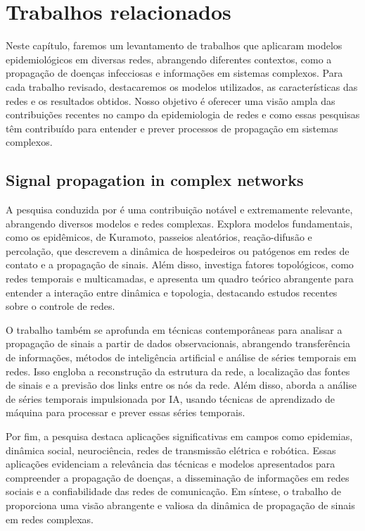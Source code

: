 \chapter{Trabalhos relacionados}

Neste capítulo, faremos um levantamento de trabalhos que aplicaram modelos epidemiológicos em diversas redes, abrangendo diferentes contextos, como a propagação de doenças infecciosas e informações em sistemas complexos. Para cada trabalho revisado, destacaremos os modelos utilizados, as características das redes e os resultados obtidos. Nosso objetivo é oferecer uma visão ampla das contribuições recentes no campo da epidemiologia de redes e como essas pesquisas têm contribuído para entender e prever processos de propagação em sistemas complexos.

\section{Signal propagation in complex networks}

A pesquisa conduzida por  é uma contribuição notável e extremamente relevante, abrangendo diversos modelos e redes complexas. Explora modelos fundamentais, como os epidêmicos, de Kuramoto, passeios aleatórios, reação-difusão e percolação, que descrevem a dinâmica de hospedeiros ou patógenos em redes de contato e a propagação de sinais. Além disso, investiga fatores topológicos, como redes temporais e multicamadas, e apresenta um quadro teórico abrangente para entender a interação entre dinâmica e topologia, destacando estudos recentes sobre o controle de redes.

O trabalho também se aprofunda em técnicas contemporâneas para analisar a propagação de sinais a partir de dados observacionais, abrangendo transferência de informações, métodos de inteligência artificial e análise de séries temporais em redes. Isso engloba a reconstrução da estrutura da rede, a localização das fontes de sinais e a previsão dos links entre os nós da rede. Além disso, aborda a análise de séries temporais impulsionada por IA, usando técnicas de aprendizado de máquina para processar e prever essas séries temporais.

Por fim, a pesquisa destaca aplicações significativas em campos como epidemias, dinâmica social, neurociência, redes de transmissão elétrica e robótica. Essas aplicações evidenciam a relevância das técnicas e modelos apresentados para compreender a propagação de doenças, a disseminação de informações em redes sociais e a confiabilidade das redes de comunicação. Em síntese, o trabalho de  proporciona uma visão abrangente e valiosa da dinâmica de propagação de sinais em redes complexas.


